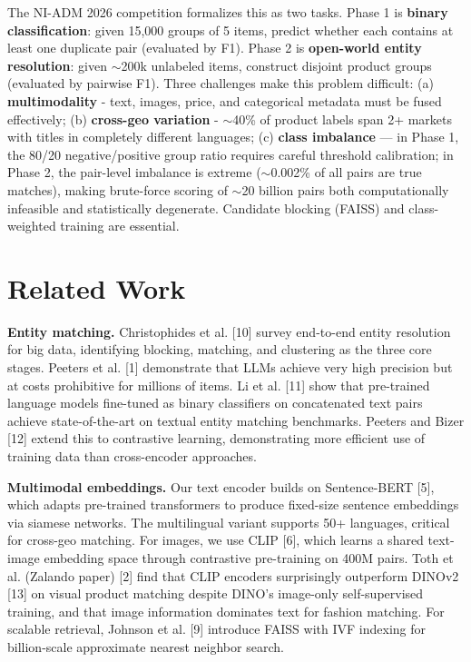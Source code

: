 \documentclass[10pt,twocolumn,a4paper]{article}
\begin{document}
The NI-ADM 2026 competition formalizes this as two tasks. Phase 1 is \textbf{binary classification}: given 15,000 groups of 5 items, 
predict whether each contains at least one duplicate pair (evaluated by F1). Phase 2 is \textbf{open-world entity resolution}: 
given $\sim$200k unlabeled items, construct disjoint product groups (evaluated by pairwise F1). Three challenges make this 
problem difficult:
(a) \textbf{multimodality} - text, images, price, and categorical metadata must be fused effectively;
(b) \textbf{cross-geo variation} - $\sim$40\% of product labels span 2+ markets with titles in completely different languages;
(c) \textbf{class imbalance} — in Phase 1, the 80/20 negative/positive group 
ratio requires careful threshold calibration; in Phase 2, the pair-level 
imbalance is extreme ($\sim$0.002\% of all pairs are true matches), making 
brute-force scoring of $\sim$20 billion pairs both computationally infeasible 
and statistically degenerate. Candidate blocking (FAISS) and class-weighted 
training are essential.

\section{Related Work}
\textbf{Entity matching.} Christophides et al. [10] survey end-to-end entity resolution for big data, identifying blocking,
 matching, and clustering as the three core stages. 
 Peeters et al. [1] demonstrate that LLMs achieve very high precision but at costs prohibitive for millions of items. 
 Li et al. [11] show that pre-trained language models fine-tuned as binary classifiers on concatenated text pairs achieve 
 state-of-the-art on textual entity matching benchmarks. Peeters and Bizer [12] extend this to contrastive learning, 
 demonstrating more efficient use of training data than cross-encoder approaches.

\textbf{Multimodal embeddings.} Our text encoder builds on Sentence-BERT [5], which adapts pre-trained transformers 
to produce fixed-size sentence embeddings via siamese networks. The multilingual variant supports 50+ languages, 
critical for cross-geo matching. For images, we use CLIP [6], which learns a shared text-image embedding space through 
contrastive pre-training on 400M pairs. Toth et al. (Zalando paper) [2] find that CLIP encoders surprisingly outperform DINOv2 [13] on visual product matching despite DINO's image-only self-supervised training, and that image information dominates text for fashion matching. For scalable retrieval, Johnson et al. [9] introduce FAISS with IVF indexing for billion-scale approximate nearest neighbor search.
\end{document}

